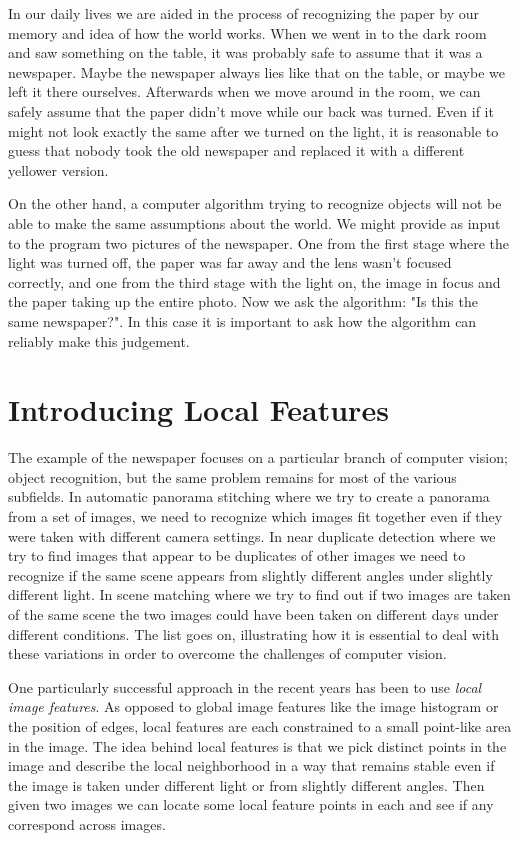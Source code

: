 In our daily lives we are aided in the process of recognizing the paper 
by our memory and idea of how the world works. When we went in to the 
dark room and saw something on the table, it was probably safe to assume 
that it was a newspaper.  Maybe the newspaper always lies like that on 
the table, or maybe we left it there ourselves. Afterwards when we move 
around in the room, we can safely assume that the paper didn't move 
while our back was turned. Even if it might not look exactly the same 
after we turned on the light, it is reasonable to guess that nobody took 
the old newspaper and replaced it with a different yellower version.

On the other hand, a computer algorithm trying to recognize objects will 
not be able to make the same assumptions about the world. We might 
provide as input to the program two pictures of the newspaper. One from 
the first stage where the light was turned off, the paper was far away 
and the lens wasn't focused correctly, and one from the third stage with 
the light on, the image in focus and the paper taking up the entire 
photo.  Now we ask the algorithm: "Is this the same newspaper?". In this 
case it is important to ask how the algorithm can reliably make this 
judgement.

\section{Introducing Local Features}

The example of the newspaper focuses on a particular branch of computer 
vision; object recognition, but the same problem remains for most of the 
various subfields. In automatic panorama stitching where we try to 
create a panorama from a set of images, we need to recognize which 
images fit together even if they were taken with different camera 
settings.  In near duplicate detection where we try to find images that 
appear to be duplicates of other images we need to recognize if the same 
scene appears from slightly different angles under slightly different 
light.  In scene matching where we try to find out if two images are 
taken of the same scene the two images could have been taken on 
different days under different conditions. The list goes on, 
illustrating how it is essential to deal with these variations in order 
to overcome the challenges of computer vision.

One particularly successful approach in the recent years has been to use 
\emph{local image features}. As opposed to global image features like 
the image histogram or the position of edges, local features are each 
constrained to a small point-like area in the image. The idea behind 
local features is that we pick distinct points in the image and describe 
the local neighborhood in a way that remains stable even if the image is 
taken under different light or from slightly different angles. Then 
given two images we can locate some local feature points in each and see 
if any correspond across images.

